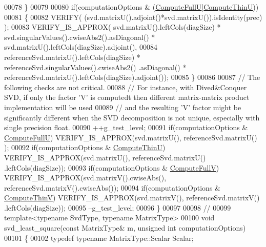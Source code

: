 \begin{DoxyCode}
00078   \}
00079   
00080   \textcolor{keywordflow}{if}(computationOptions & (\hyperlink{group__enums_ggae3e239fb70022eb8747994cf5d68b4a9a2b4f91ca5859a4159dbfe8090043817f}{ComputeFullU}|\hyperlink{group__enums_ggae3e239fb70022eb8747994cf5d68b4a9af8c742a1aa87773e165eae406c9ccaf8}{ComputeThinU}))
00081   \{
00082     VERIFY( (svd.matrixU().adjoint()*svd.matrixU()).isIdentity(prec) );
00083     VERIFY\_IS\_APPROX( svd.matrixU().leftCols(diagSize) * svd.singularValues().cwiseAbs2().asDiagonal() * 
      svd.matrixU().leftCols(diagSize).adjoint(),
00084                       referenceSvd.matrixU().leftCols(diagSize) * referenceSvd.singularValues().cwiseAbs2()
      .asDiagonal() * referenceSvd.matrixU().leftCols(diagSize).adjoint());
00085   \}
00086   
00087   \textcolor{comment}{// The following checks are not critical.}
00088   \textcolor{comment}{// For instance, with Dived&Conquer SVD, if only the factor 'V' is computedt then different matrix-matrix
       product implementation will be used}
00089   \textcolor{comment}{// and the resulting 'V' factor might be significantly different when the SVD decomposition is not
       unique, especially with single precision float.}
00090   ++g\_test\_level;
00091   \textcolor{keywordflow}{if}(computationOptions & \hyperlink{group__enums_ggae3e239fb70022eb8747994cf5d68b4a9a2b4f91ca5859a4159dbfe8090043817f}{ComputeFullU})  VERIFY\_IS\_APPROX(svd.matrixU(), referenceSvd.matrixU()
      );
00092   \textcolor{keywordflow}{if}(computationOptions & \hyperlink{group__enums_ggae3e239fb70022eb8747994cf5d68b4a9af8c742a1aa87773e165eae406c9ccaf8}{ComputeThinU})  VERIFY\_IS\_APPROX(svd.matrixU(), referenceSvd.matrixU()
      .leftCols(diagSize));
00093   \textcolor{keywordflow}{if}(computationOptions & \hyperlink{group__enums_ggae3e239fb70022eb8747994cf5d68b4a9a52c6f7e80bbf9a42297c88f700245b51}{ComputeFullV})  VERIFY\_IS\_APPROX(svd.matrixV().cwiseAbs(), 
      referenceSvd.matrixV().cwiseAbs());
00094   \textcolor{keywordflow}{if}(computationOptions & \hyperlink{group__enums_ggae3e239fb70022eb8747994cf5d68b4a9a1055e53fa95c8ae04a07ebb72cfafd95}{ComputeThinV})  VERIFY\_IS\_APPROX(svd.matrixV(), referenceSvd.matrixV()
      .leftCols(diagSize));
00095   --g\_test\_level;
00096 \}
00097 
00098 \textcolor{comment}{//}
00099 \textcolor{keyword}{template}<\textcolor{keyword}{typename} SvdType, \textcolor{keyword}{typename} MatrixType>
00100 \textcolor{keywordtype}{void} svd\_least\_square(\textcolor{keyword}{const} MatrixType& m, \textcolor{keywordtype}{unsigned} \textcolor{keywordtype}{int} computationOptions)
00101 \{
00102   \textcolor{keyword}{typedef} \textcolor{keyword}{typename} MatrixType::Scalar Scalar;

\end{DoxyCode}
